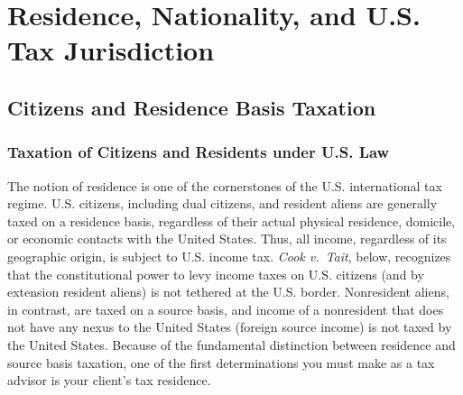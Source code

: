  
\chapter{Residence, Nationality, and U.S. Tax Jurisdiction}
	\section{Citizens and Residence Basis Taxation}


			\subsection{Taxation of Citizens and Residents under U.S. Law}

The notion of residence is one of the cornerstones of the U.S. international tax regime.  U.S. citizens, including dual citizens, and resident aliens are generally taxed on a residence basis, regardless of their actual physical residence, domicile, or economic contacts with the United States. Thus,   all income, regardless of its geographic origin, is subject to U.S. income tax.  \emph{Cook v.\ Tait}, below, recognizes that the constitutional power to levy income taxes on U.S. citizens (and by extension resident aliens) is not tethered at the U.S. border.  Nonresident aliens, in contrast, are taxed on a source basis, and income of a nonresident that does not have any nexus to the United States (foreign source income) is not taxed by the United States.  Because of the fundamental distinction between residence and source basis taxation, one of the first determinations you must make as a tax advisor is your client's tax residence.


